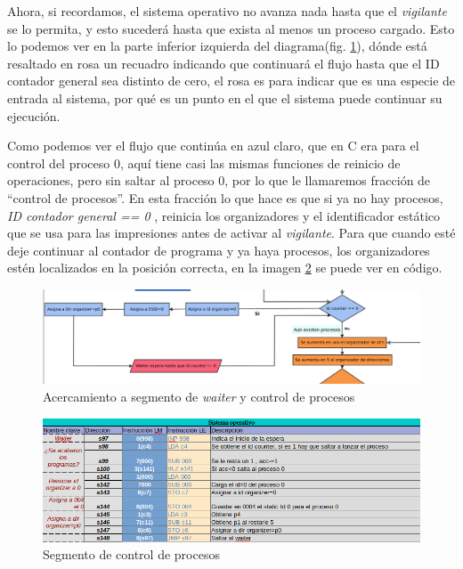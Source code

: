 \documentclass[letterpaper,12pt,oneside]{book}
\begin{document}
			
				Ahora, si recordamos, el sistema operativo no avanza nada hasta que el \textit{vigilante} se lo permita, y esto sucederá hasta que
				exista al menos un proceso cargado. Esto lo podemos ver en la parte inferior izquierda del diagrama(fig. \ref{fig:diag_somp_waiter}), dónde
				está resaltado en rosa un recuadro indicando que continuará el flujo hasta que el ID contador general sea distinto de cero, el
				rosa es para indicar que es una especie de entrada al sistema, por qué es un punto en el que el sistema puede continuar su ejecución.
    
                Como
				podemos ver el flujo que continúa en azul claro, que en C era para el control del proceso 0, aquí tiene casi las mismas funciones de
				reinicio de operaciones, pero sin saltar al proceso 0, por lo que le llamaremos fracción de ``control de procesos''. En esta fracción
				lo que hace es que si ya no hay procesos, \textit{ID contador general == 0} , reinicia los organizadores y el identificador estático que se usa para las impresiones  antes
				de activar al \textit{vigilante}. Para que cuando esté deje continuar al contador de programa y ya haya procesos,
				los organizadores estén localizados en la posición correcta, en la imagen \ref{fig:somp_controlprocesos} se puede ver en código.
			
			
			\begin{figure}[h]		
				\centering
				\includegraphics[scale=0.45]{media/Paralela/diag_somp_waiter.png}
				\caption{ Acercamiento a segmento de  \textit{waiter} y control de procesos}
				\label{fig:diag_somp_waiter}
			\end{figure}	
			
			
			\begin{figure}[h]		
				\centering
				\includegraphics[scale=0.53]{media/Paralela/somp_controlprocesos.png}
				\caption{Segmento de control de procesos}
				\label{fig:somp_controlprocesos}
			\end{figure}	
			
\end{document}
